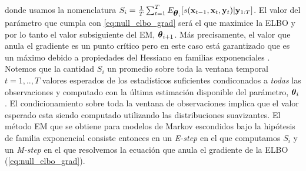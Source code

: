 donde usamos la nomenclatura $S_i = \frac{1}{T}\sum_{t=1}^T E_{\mbox{\boldmath$ \theta $}_i} [s(\mathbf{x}_{t-1}, \mathbf{x}_t, \mathbf{y}_t) | \mathbf{y}_{1:T}]$. El valor del parámetro que cumpla con \ref{eq:null_elbo_grad} será el que maximice la ELBO y por lo tanto el valor subsiguiente del EM, $\mbox{\boldmath$ \theta $}_{i+1}$. Más precisamente, el valor que anula el gradiente es un punto crítico pero en este caso está garantizado que es un máximo debido a propiedades del Hessiano en familias exponenciales \citep{Wainwright2008}. Notemos que la cantidad $S_i$ un promedio sobre toda la ventana temporal $t=1, .., T$ valores esperados de los estadísticos suficientes condiconados a \textit{todas} las observaciones y computado con la última estimación disponible del parámetro, $\mbox{\boldmath$ \theta $}_i$. El condicionamiento sobre toda la ventana de observaciones implica que el valor esperado esta siendo computado utilizando las distribuciones suavizantes. El método EM que se obtiene para modelos de Markov escondidos bajo la hipótesis de familia exponencial consiste entonces en un \textit{E-step} en el que computamos $S_i$ y un \textit{M-step} en el que resolvemos la ecuación que anula el gradiente de la ELBO (\ref{eq:null_elbo_grad}).

